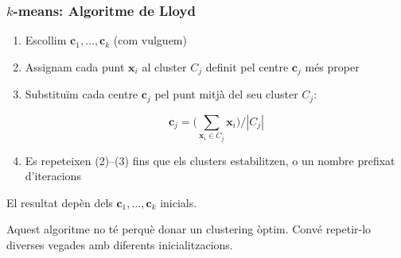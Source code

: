 \documentclass[12pt,t]{beamer}
\theoremstyle{plain}
\theoremstyle{definition}
\begin{document}
\begin{frame}
\frametitle{$k$-means: Algoritme de Lloyd}
\vspace*{-3ex}

\begin{enumerate}
\item Escollim $\mathbf{c}_1,\ldots,\mathbf{c}_k$ (com vulguem)
\medskip

\item Assignam cada punt $\mathbf{x}_i$ al cluster $C_j$ definit pel centre $\mathbf{c}_j$ més proper
\medskip

\item Substituïm cada centre $\mathbf{c}_j$ pel punt mitjà del seu cluster $C_j$:
\vspace*{-1ex}

$$
\mathbf{c}_j= \Big(\sum_{\mathbf{x}_i\in C_j} \mathbf{x}_i\Big)/|C_j|
$$
\vspace*{-2ex}

\item Es repeteixen (2)--(3) fins que els clusters estabilitzen, o un nombre prefixat d'iteracions
\end{enumerate}
El resultat depèn dels $\mathbf{c}_1,\ldots,\mathbf{c}_k$ inicials.
\medskip

Aquest algoritme no té perquè donar un clustering òptim. Convé repetir-lo diverses vegades amb diferents inicialitzacions.


\end{frame}
\end{document}
